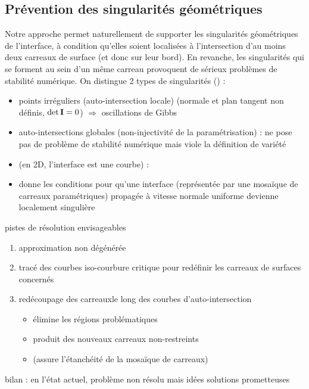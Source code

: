 \subsection{Prévention des singularités géométriques}
Notre approche permet naturellement de supporter les singularités géométriques de l'interface, à condition qu'elles soient localisées à l'intersection d'au moins deux carreaux de surface (et donc sur leur bord).
En revanche, les singularités qui se forment au sein d'un même carreau provoquent de sérieux problèmes de stabilité numérique.
On distingue 2 types de singularités (\cite[p.320]{patrikalakis2009}) :
\begin{itemize}
	\item points irréguliers (auto-intersection locale) (normale et plan tangent non définis, $\det{\mathbf{I}} = 0$) $\Rightarrow$ oscillations de Gibbs
	\item auto-intersections globales (non-injectivité de la paramétrisation) : ne pose pas de problème de stabilité numérique mais viole la définition de variété
\end{itemize}

\begin{itemize}
	\item \cite{jiao2001} (en 2D, \ie l'interface est une courbe) : 
	\item \cite{farouki1986} donne les conditions pour qu'une interface (représentée par une mosaïque de carreaux paramétriques) propagée à vitesse normale uniforme devienne localement singulière
\end{itemize}

pistes de résolution envisageables
\begin{enumerate}
	\item approximation non dégénérée \cite{farouki1986}
	\item tracé des courbes iso-courbure critique \cite[chap.8]{patrikalakis2009} pour redéfinir les carreaux de surfaces concernés
	\item redécoupage des carreauxle long des courbes d'auto-intersection \cite{urick2019} 
	\begin{itemize}
		\item élimine les régions problématiques
		\item produit des nouveaux carreaux non-restreints
		\item (assure l'étanchéité de la mosaïque de carreaux)
	\end{itemize}
	
\end{enumerate}

bilan : en l'état actuel, problème non résolu mais idées solutions prometteuses